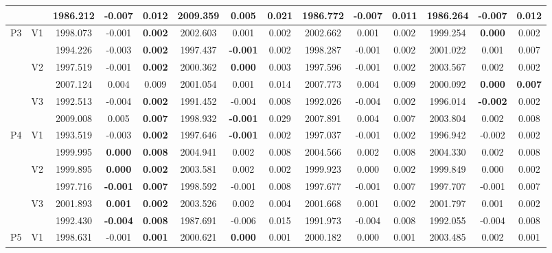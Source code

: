 \documentclass[12pt,a4paper]{article}
\begin{document}
\begin{sidewaystable}[ht]
{\begin{tabular}{cc|ccc|ccc|ccc|ccc|}
   &  & 1986.212 & -0.007 & 0.012 & 2009.359 & \textbf{0.005} & 0.021 & 1986.772 & -0.007 & \textbf{0.011} & 1986.264 & -0.007 & 0.012 \\ 
   \hline \hline\multirow{6}{*}{P3} & \multirow{2}{*}{V1} & 1998.073 & -0.001 & \textbf{0.002} & 2002.603 & 0.001 & 0.002 & 2002.662 & 0.001 & 0.002 & 1999.254 & \textbf{0.000} & 0.002 \\ 
   &  & 1994.226 & -0.003 & \textbf{0.002} & 1997.437 & \textbf{-0.001} & 0.002 & 1998.287 & -0.001 & 0.002 & 2001.022 & 0.001 & 0.007 \\ 
   & \multirow{2}{*}{V2} & 1997.519 & -0.001 & \textbf{0.002} & 2000.362 & \textbf{0.000} & 0.003 & 1997.596 & -0.001 & 0.002 & 2003.567 & 0.002 & 0.002 \\ 
   &  & 2007.124 & 0.004 & 0.009 & 2001.054 & 0.001 & 0.014 & 2007.773 & 0.004 & 0.009 & 2000.092 & \textbf{0.000} & \textbf{0.007} \\ 
   & \multirow{2}{*}{V3} & 1992.513 & -0.004 & \textbf{0.002} & 1991.452 & -0.004 & 0.008 & 1992.026 & -0.004 & 0.002 & 1996.014 & \textbf{-0.002} & 0.002 \\ 
   &  & 2009.008 & 0.005 & \textbf{0.007} & 1998.932 & \textbf{-0.001} & 0.029 & 2007.891 & 0.004 & 0.007 & 2003.804 & 0.002 & 0.008 \\ 
   \hline \hline\multirow{6}{*}{P4} & \multirow{2}{*}{V1} & 1993.519 & -0.003 & \textbf{0.002} & 1997.646 & \textbf{-0.001} & 0.002 & 1997.037 & -0.001 & 0.002 & 1996.942 & -0.002 & 0.002 \\ 
   &  & 1999.995 & \textbf{0.000} & \textbf{0.008} & 2004.941 & 0.002 & 0.008 & 2004.566 & 0.002 & 0.008 & 2004.330 & 0.002 & 0.008 \\ 
   & \multirow{2}{*}{V2} & 1999.895 & \textbf{0.000} & \textbf{0.002} & 2003.581 & 0.002 & 0.002 & 1999.923 & 0.000 & 0.002 & 1999.849 & 0.000 & 0.002 \\ 
   &  & 1997.716 & \textbf{-0.001} & \textbf{0.007} & 1998.592 & -0.001 & 0.008 & 1997.677 & -0.001 & 0.007 & 1997.707 & -0.001 & 0.007 \\ 
   & \multirow{2}{*}{V3} & 2001.893 & \textbf{0.001} & \textbf{0.002} & 2003.526 & 0.002 & 0.004 & 2001.668 & 0.001 & 0.002 & 2001.797 & 0.001 & 0.002 \\ 
   &  & 1992.430 & \textbf{-0.004} & \textbf{0.008} & 1987.691 & -0.006 & 0.015 & 1991.973 & -0.004 & 0.008 & 1992.055 & -0.004 & 0.008 \\ 
   \hline \hline\multirow{6}{*}{P5} & \multirow{2}{*}{V1} & 1998.631 & -0.001 & \textbf{0.001} & 2000.621 & \textbf{0.000} & 0.001 & 2000.182 & 0.000 & 0.001 & 2003.485 & 0.002 & 0.001 \\ 

\end{tabular}}
\end{sidewaystable}
\end{document}
